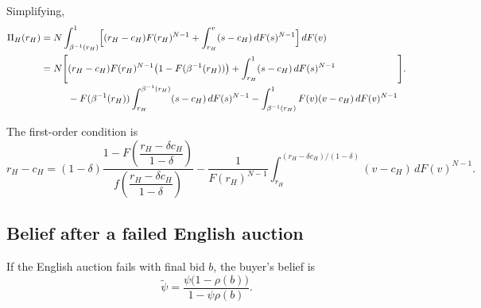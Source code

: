 Simplifying,
\begin{align}
  \Pi_H(r_H)
  &= N \int_{\beta^{-1}(r_H)}^{1}
    \Bigl[
      (r_H - c_H) F(r_H)^{N-1}
      + \int_{r_H}^{v} (s - c_H)\, dF(s)^{N-1}
    \Bigr]
    \, dF(v)
  \notag\\
  &= N \Biggl[
    \begin{aligned}[t]
      &(r_H - c_H) F(r_H)^{N-1}
        \bigl(1 - F(\beta^{-1}(r_H))\bigr)
      + \int_{r_H}^{1} (s - c_H)\, dF(s)^{N-1} \\
      &- F(\beta^{-1}(r_H))
        \int_{r_H}^{\beta^{-1}(r_H)} (s - c_H)\, dF(s)^{N-1}
      - \int_{\beta^{-1}(r_H)}^{1}
        F(v)(v - c_H)\, dF(v)^{N-1}
    \end{aligned}
  \Biggr].
  \label{eq:Pi-H-expanded}
\end{align}

The first-order condition is
\begin{equation}
  r_H - c_H
  = (1 - \delta)
    \frac{
      1 - F\!\left(\dfrac{r_H - \delta c_H}{1 - \delta}\right)
    }{
      f\!\left(\dfrac{r_H - \delta c_H}{1 - \delta}\right)
    }
  - \frac{1}{F(r_H)^{N-1}}
    \int_{r_H}^{(r_H - \delta c_H)/(1 - \delta)}
      (v - c_H)\, dF(v)^{N-1}.
  \label{eq:FOC-high-cost}
\end{equation}

\subsection{Belief after a failed English auction}
\label{subsec:belief-failed}

If the English auction fails with final bid $b$, the buyer's belief is
\begin{equation}
  \tilde{\psi}
  = \frac{\psi\bigl(1 - \rho(b)\bigr)}{1 - \psi \rho(b)}.
  \label{eq:belief-update}
\end{equation}
